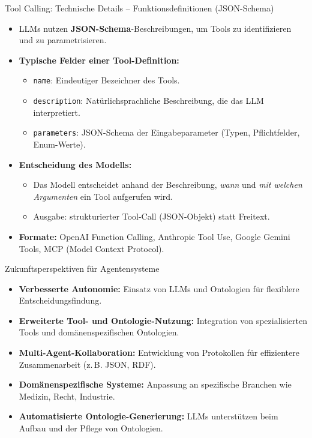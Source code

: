 \documentclass[aspectratio=1610, xcolor=dvipsnames, 9pt]{beamer}
\begin{document}
\begin{frame}{Tool Calling: Technische Details -- Funktionsdefinitionen (JSON-Schema)}
  \begin{itemize}
    \item LLMs nutzen \textbf{JSON-Schema}-Beschreibungen, um Tools zu identifizieren und zu parametrisieren.
    \item \textbf{Typische Felder einer Tool-Definition:}
      \begin{itemize}
        \item \texttt{name}: Eindeutiger Bezeichner des Tools.
        \item \texttt{description}: Natürlichsprachliche Beschreibung, die das LLM interpretiert.
        \item \texttt{parameters}: JSON-Schema der Eingabeparameter (Typen, Pflichtfelder, Enum-Werte).
      \end{itemize}
    \item \textbf{Entscheidung des Modells:}
      \begin{itemize}
        \item Das Modell entscheidet anhand der Beschreibung, \emph{wann} und \emph{mit welchen Argumenten} ein Tool aufgerufen wird.
        \item Ausgabe: strukturierter Tool-Call (JSON-Objekt) statt Freitext.
      \end{itemize}
    \item \textbf{Formate:} OpenAI Function Calling, Anthropic Tool Use, Google Gemini Tools, MCP (Model Context Protocol).
  \end{itemize}
\end{frame}

\begin{frame}{Zukunftsperspektiven für Agentensysteme}
  \begin{itemize}
    \item \textbf{Verbesserte Autonomie:} Einsatz von LLMs und Ontologien für flexiblere Entscheidungsfindung.
    \item \textbf{Erweiterte Tool- und Ontologie-Nutzung:} Integration von spezialisierten Tools und domänenspezifischen Ontologien.
    \item \textbf{Multi-Agent-Kollaboration:} Entwicklung von Protokollen für effizientere Zusammenarbeit (z. B. JSON, RDF).
    \item \textbf{Domänenspezifische Systeme:} Anpassung an spezifische Branchen wie Medizin, Recht, Industrie.
    \item \textbf{Automatisierte Ontologie-Generierung:} LLMs unterstützen beim Aufbau und der Pflege von Ontologien.
  \end{itemize}
\end{frame}
\end{document}
